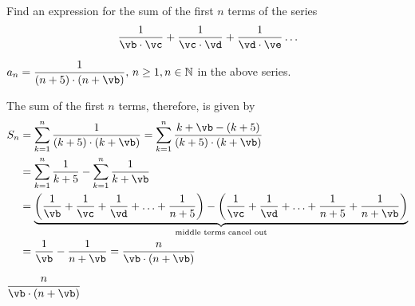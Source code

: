 


\ADD{}\vb
\ADD{}\vc
\ADD{}\vd
\ADD{}\ve

\question[3] Find an expression for the sum of the first $n$ terms of the series 
 \[ \dfrac{1}{\vb\cdot\vc} + \dfrac{1}{\vc\cdot\vd} + \dfrac{1}{\vd\cdot\ve}\ldots \]

\watchout

\begin{solution}[\halfpage]
	 $a_n = \dfrac{1}{(n+\va)\cdot(n+\vb)},\, n \geq 1, n\in\mathbb{N}$ in the above series. 

	 The sum of the first $n$ terms, therefore, is given by 
	 \begin{align}
	 	S_n &= \sum_{k=1}^{n}\dfrac{1}{(k+\va)\cdot(k+\vb)} =
	 	  \sum_{k=1}^{n}\dfrac{k+\vb - (k+\va)}{(k+\va)\cdot(k+\vb)} \\
	 	&= \sum_{k=1}^{n}\dfrac{1}{k+\va} - \sum_{k=1}^{n}\dfrac{1}{k+\vb} \\
	 	&= \underbrace{\left( \frac{1}{\vb} + \frac{1}{\vc} + \frac{1}{\vd} + \ldots + \frac{1}{n+\va}\right) - 
	 	\left( \frac{1}{\vc} + \frac{1}{\vd} + \ldots + \frac{1}{n+\va} + \frac{1}{n+\vb}\right)}_{\text{middle terms cancel out}} \\
	 	&= \dfrac{1}{\vb} - \dfrac{1}{n+\vb} = 
    \dfrac{n}{\vb\cdot(n+\vb)}
	 \end{align}
\end{solution}

\ifprintanswers
  \begin{codex}
    $\dfrac{n}{\vb\cdot(n+\vb)}$
  \end{codex}
\fi
